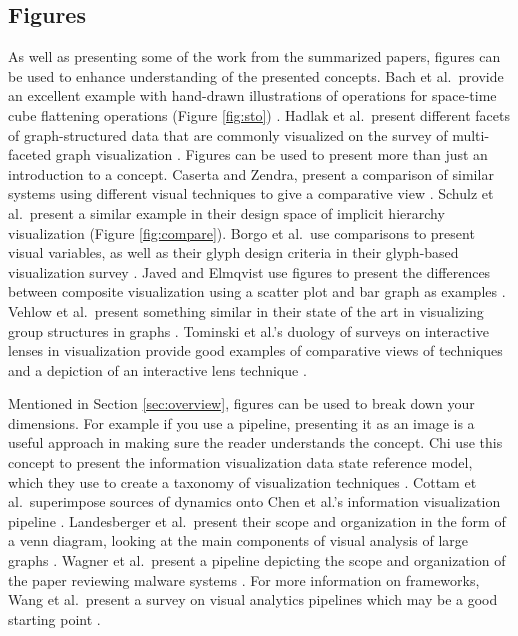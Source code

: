 \subsection{Figures} \label{sec:figures}
As well as presenting some of the work from the summarized papers, figures can be used to enhance understanding of the presented concepts. Bach et al.\ provide an excellent example with hand-drawn illustrations of operations for space-time cube flattening operations (Figure \ref{fig:sto}) \cite{bach2014review}. Hadlak et al.\ present different facets of graph-structured data that are commonly visualized on the survey of multi-faceted graph visualization \cite{hadlak2015survey}. Figures can be used to present more than just an introduction to a concept. Caserta and Zendra, present a comparison of similar systems using different visual techniques to give a comparative view \cite{caserta2011visualization}. Schulz et al.\ present a similar example in their design space of implicit hierarchy visualization \cite{schulz2011design} (Figure \ref{fig:compare}). Borgo et al.\ use comparisons to present visual variables, as well as their glyph design criteria in their glyph-based visualization survey \cite{borgo2013glyph}.  Javed and Elmqvist use figures to present the differences between composite visualization using a scatter plot and bar graph as examples \cite{javed2012exploring}. Vehlow et al.\ present something similar in their state of the art in visualizing group structures in graphs \cite{vehlow2015state}. Tominski et al.'s duology of surveys on interactive lenses in visualization provide good examples of comparative views of techniques and a depiction of an interactive lens technique \cite{tominski2014survey,tominski2016interactive}.

Mentioned in Section \ref{sec:overview}, figures can be used to break down your dimensions. For example if you use a pipeline, presenting it as an image is a useful approach in making sure the reader understands the concept. Chi use this concept to present the information visualization data state reference model, which they use to create a taxonomy of visualization techniques \cite{chi2000taxonomy}. Cottam et al.\ superimpose sources of dynamics onto Chen et al.'s information visualization pipeline \cite{cottam2012watch,card1999readings}. Landesberger et al.\ present their scope and organization in the form of a venn diagram, looking at the main components of visual analysis of large graphs \cite{von2011visual}. Wagner et al.\ present a pipeline depicting the scope and organization of the paper reviewing malware systems \cite{wagner2015survey}. 
For more information on frameworks, Wang et al.\ present a survey on visual analytics pipelines which may be a good starting point \cite{wang2016survey}.



